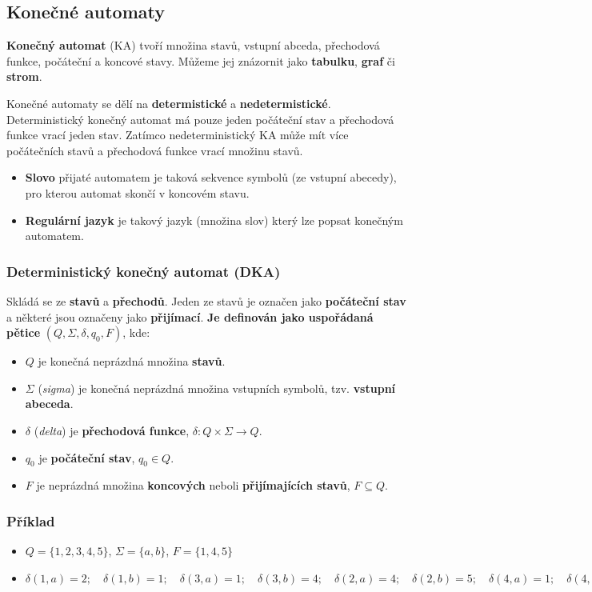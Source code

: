 \subsection{Konečné automaty}
\textbf{Konečný automat} (KA) tvoří množina stavů, vstupní abceda, přechodová funkce, počáteční a koncové stavy. Můžeme jej znázornit jako \textbf{tabulku}, \textbf{graf} či \textbf{strom}.

Konečné automaty se dělí na \textbf{determistické} a \textbf{nedetermistické}. Deterministický konečný automat má pouze jeden počáteční stav a přechodová funkce vrací jeden stav. Zatímco nedeterministický KA může mít více počátečních stavů a přechodová funkce vrací množinu stavů.

\begin{itemize}
\item \textbf{Slovo} přijaté automatem je taková sekvence symbolů (ze vstupní abecedy), pro kterou automat skončí v koncovém stavu.
\item \textbf{Regulární jazyk} je takový jazyk (množina slov) který lze popsat konečným automatem. 
\end{itemize}

\subsubsection{Deterministický konečný automat (DKA)}
Skládá se ze \textbf{stavů} a \textbf{přechodů}. Jeden ze stavů je označen jako \textbf{počáteční stav} a některé jsou označeny jako \textbf{přijímací}. \textbf{Je definován jako uspořádaná pětice} $(Q, \Sigma, \delta, q_0, F)$, kde: 
\begin{itemize}
	\item $Q$ je konečná neprázdná množina \textbf{stavů}. 
	\item $\Sigma$ (\textit{sigma}) je konečná neprázdná množina vstupních symbolů, tzv. \textbf{vstupní abeceda}. 
	\item $\delta$ (\textit{delta}) je \textbf{přechodová funkce}, $\delta: Q\times\Sigma \rightarrow Q$. 
	\item $q_0$ je \textbf{počáteční stav}, $q_0 \in Q$.
	\item $F$ je neprázdná množina \textbf{koncových} neboli \textbf{přijímajících stavů}, $F \subseteq Q$.
\end{itemize}

\subsubsection*{Příklad}
\begin{itemize}
	\item $Q = \{1, 2, 3, 4, 5\}$, $\Sigma = \{a, b\}$, $F =  \{1, 4, 5\}$
	\item $\delta(1, a) = 2 ;\quad \delta(1, b) = 1   ;\quad \delta(3, a) = 1  ;\quad \delta(3, b) = 4; \quad  \delta(2, a) = 4  ; \quad  \delta(2, b) = 5; \quad  \delta(4, a) = 1;  \quad \delta(4, b) = 3;  \quad \delta(5, a) = 4; \quad  \delta(5, b) = 5$
\end{itemize}

